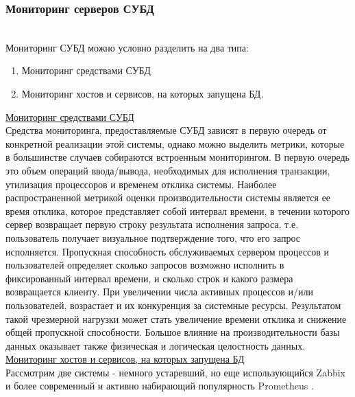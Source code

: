 
\subsubsection{Мониторинг серверов СУБД} ~\\
Мониторинг СУБД можно условно разделить на два типа:
\begin{enumerate}
    \item Мониторинг средствами СУБД
    \item Мониторинг хостов и сервисов, на которых запущена БД.
\end{enumerate}
\underline{Мониторинг средствами СУБД} \\ Средства мониторинга, предоставляемые СУБД зависят в первую очередь от конкретной реализации этой системы, однако можно выделить метрики, которые в большинстве случаев собираются встроенным мониторингом. В первую очередь это объем операций ввода/вывода, необходимых для исполнения транзакции, утилизация процессоров и временем отклика системы. Наиболее распространенной метрикой оценки производительности системы является ее время отклика, которое представляет собой интервал времени, в течении которого сервер возвращает первую строку результата исполнения запроса, т.е. пользователь получает визуальное подтверждение того, что его запрос исполняется. Пропускная способность обслуживаемых сервером процессов и пользователей определяет сколько запросов возможно исполнить в фиксированный интервал времени, и сколько строк и какого размера возвращается клиенту. При увеличении числа активных процессов и/или пользователей, возрастает и их конкуренция за системные ресурсы. Результатом такой чрезмерной нагрузки может стать увеличение времени отклика и снижение общей пропускной способности. Большое влияние на производительности базы данных оказывает также физическая и логическая целостность данных. \\
\underline{Мониторинг хостов и сервисов, на которых запущена БД} \\ Рассмотрим две системы - немного устаревший, но еще использующийся Zabbix и более современный и активно набирающий популярность Prometheus \autocite{Prometheus-vs-Zabbix}.
